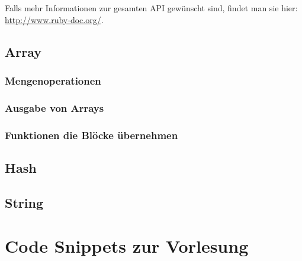 \documentclass[a4book,11pt,twoside]{scrbook}
\begin{document}
Falls mehr Informationen zur gesamten API gewünscht sind, findet man sie hier: \url{http://www.ruby-doc.org/}.



\section{Array} %
\label{sec:array}
\subsection{Mengenoperationen} %
\label{sub:mengenoperationen}


\subsection{Ausgabe von Arrays} %
\label{ssub:ausgabe_von_arrays}


\subsection{Funktionen die Blöcke übernehmen} %
\label{sub:funktionen_die_blöcke_übernehmen}




\section{Hash} %
\label{sec:hash}




\section{String} %
\label{sec:string}













\chapter{Code Snippets zur Vorlesung}
\end{document}
